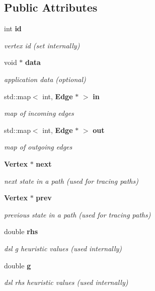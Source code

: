 \subsection*{Public Attributes}
\begin{DoxyCompactItemize}
\item 
int {\bf id}
\begin{DoxyCompactList}\small\item\em vertex id (set internally) \end{DoxyCompactList}\item 
void $\ast$ {\bf data}
\begin{DoxyCompactList}\small\item\em application data (optional) \end{DoxyCompactList}\item 
std\-::map$<$ int, {\bf Edge} $\ast$ $>$ {\bf in}
\begin{DoxyCompactList}\small\item\em map of incoming edges \end{DoxyCompactList}\item 
std\-::map$<$ int, {\bf Edge} $\ast$ $>$ {\bf out}
\begin{DoxyCompactList}\small\item\em map of outgoing edges \end{DoxyCompactList}\item 
{\bf Vertex} $\ast$ {\bf next}
\begin{DoxyCompactList}\small\item\em next state in a path (used for tracing paths) \end{DoxyCompactList}\item 
{\bf Vertex} $\ast$ {\bf prev}
\begin{DoxyCompactList}\small\item\em previous state in a path (used for tracing paths) \end{DoxyCompactList}\item 
double {\bf rhs}
\begin{DoxyCompactList}\small\item\em dsl g heuristic values (used internally) \end{DoxyCompactList}\item 
double {\bf g}
\begin{DoxyCompactList}\small\item\em dsl rhs heuristic values (used internally) \end{DoxyCompactList}\end{DoxyCompactItemize}
